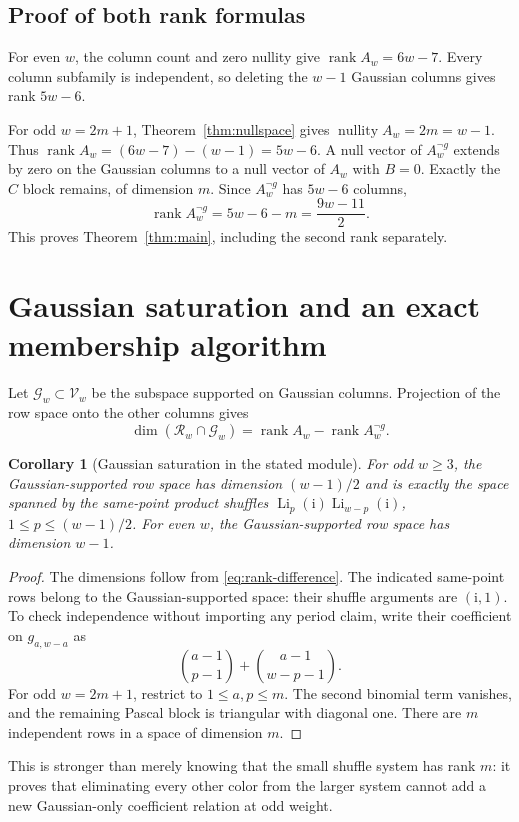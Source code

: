 \documentclass[11pt,a4paper]{article}
\numberwithin{equation}{section}
\newtheorem{corollary}[theorem]{Corollary}
\theoremstyle{definition}\newtheorem{definition}[theorem]{Definition}
\theoremstyle{remark}\newtheorem{remark}[theorem]{Remark}
\newcommand{\ii}{\mathrm i}
\newcommand{\Li}{\operatorname{Li}}
\newcommand{\rank}{\operatorname{rank}}
\newcommand{\kerdim}{\operatorname{nullity}}
\newcommand{\Gset}{\mathcal G}
\newcommand{\V}{\mathcal V}
\newcommand{\R}{\mathcal R}
\begin{document}
\subsection{Proof of both rank formulas}
For even $w$, the column count and zero nullity give
$\rank A_w=6w-7$. Every column subfamily is independent, so deleting the
$w-1$ Gaussian columns gives rank $5w-6$.

For odd $w=2m+1$, Theorem~\ref{thm:nullspace} gives
$\kerdim A_w=2m=w-1$. Thus $\rank A_w=(6w-7)-(w-1)=5w-6$.
A null vector of $A_w^{\neg g}$ extends by zero on the Gaussian columns to a
null vector of $A_w$ with $B=0$. Exactly the $C$ block remains, of dimension
$m$. Since $A_w^{\neg g}$ has $5w-6$ columns,
\[
\rank A_w^{\neg g}=5w-6-m=\frac{9w-11}{2}.
\]
This proves Theorem~\ref{thm:main}, including the second rank separately.

\section{Gaussian saturation and an exact membership algorithm}
\label{sec:membership}
Let $\Gset_w\subset\V_w$ be the subspace supported on Gaussian columns.
Projection of the row space onto the other columns gives
\begin{equation}
\dim(\R_w\cap\Gset_w)=\rank A_w-\rank A_w^{\neg g}.
\label{eq:rank-difference}
\end{equation}

\begin{corollary}[Gaussian saturation in the stated module]\label{cor:saturation}
For odd $w\ge3$, the Gaussian-supported row space has dimension $(w-1)/2$
and is exactly the space spanned by the same-point product shuffles
$\Li_p(\ii)\Li_{w-p}(\ii)$, $1\le p\le(w-1)/2$.
For even $w$, the Gaussian-supported row space has dimension $w-1$.
\end{corollary}
\begin{proof}
The dimensions follow from \eqref{eq:rank-difference}. The indicated
same-point rows belong to the Gaussian-supported space: their shuffle
arguments are $(\ii,1)$. To check independence without importing any period
claim, write their coefficient on $g_{a,w-a}$ as
\[
\binom{a-1}{p-1}+\binom{a-1}{w-p-1}.
\]
For odd $w=2m+1$, restrict to $1\le a,p\le m$. The second binomial term
vanishes, and the remaining Pascal block is triangular with diagonal one.
There are $m$ independent rows in a space of dimension $m$.
\end{proof}

This is stronger than merely knowing that the small shuffle system has rank
$m$: it proves that eliminating every other color from the larger system
cannot add a new Gaussian-only coefficient relation at odd weight.
\end{document}

